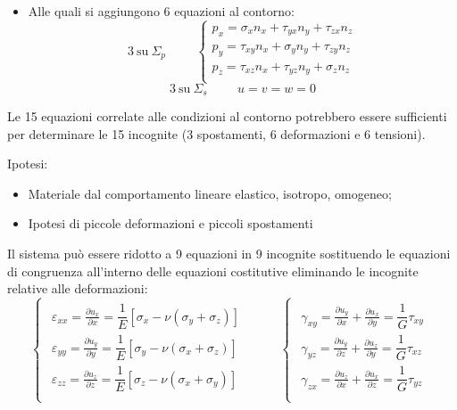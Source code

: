\documentclass{article}
\begin{document}
\begin{adjustwidth}{2in}{}
\begin{itemize}
		\item Alle quali si aggiungono 6 equazioni al contorno: 
				\[
				3 ~ \text{su} ~ \Sigma_p \hspace{1cm} 	\begin{cases}
					p_x = \sigma_x n_x + \tau_{yx}n_y + \tau_{zx}n_z \\
					p_y = \tau_{xy}n_x + \sigma_y n_y + \tau_{zy}n_z \\
					p_z = \tau_{xz}n_x + \tau_{yz}n_y + \sigma_z n_z \\
				\end{cases}
				\]
				\[
				3 ~ \text{su} ~ \Sigma_s \hspace{1cm} u = v = w = 0
				\]
	\end{itemize}

	Le 15 equazioni correlate alle condizioni al contorno potrebbero essere sufficienti per
	determinare le 15 incognite (3 spostamenti, 6 deformazioni e 6 tensioni). \newline
	
	Ipotesi:
	\begin{itemize}
		
	 \item Materiale dal comportamento lineare elastico, isotropo, omogeneo;
	
	\item Ipotesi di piccole deformazioni e piccoli spostamenti
	\end{itemize}
	
	Il sistema può essere ridotto a 9 equazioni in 9 incognite sostituendo le equazioni di
	congruenza all’interno delle equazioni costitutive eliminando le incognite relative alle
	deformazioni:
	\[ 
	\begin{cases}
		\begin{aligned}
			\varepsilon_{xx} =   \frac{\partial u_x}{\partial x} = \dfrac{1}{E}[\sigma_x - \nu(\sigma_y + \sigma_z)] \\
			\varepsilon_{yy} =   \frac{\partial u_y}{\partial y} = \dfrac{1}{E}[\sigma_y - \nu(\sigma_x + \sigma_z)] \\
			\varepsilon_{zz} =   \frac{\partial u_z}{\partial z} = \dfrac{1}{E}[\sigma_z - \nu(\sigma_x + \sigma_y)] \\
		\end{aligned}
	\end{cases} \hspace{1cm} \begin{cases}
		\begin{aligned}
			\gamma_{xy} =   \frac{\partial u_y}{\partial x} + \frac{\partial u_x}{\partial y} = \dfrac{1}{G} \tau_{xy} \\
			\gamma_{yz} =   \frac{\partial u_y}{\partial z} + \frac{\partial u_z}{\partial y} = \dfrac{1}{G} \tau_{xz} \\
			\gamma_{zx} =   \frac{\partial u_z}{\partial x} + \frac{\partial u_x}{\partial z} = \dfrac{1}{G} \tau_{yz} \\
		\end{aligned}
	\end{cases}
	\]
	

\end{adjustwidth}
\end{document}
